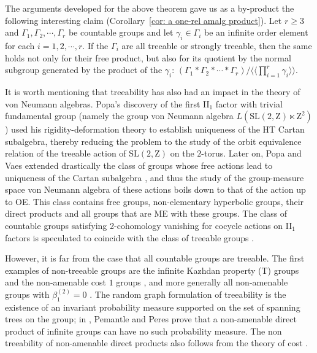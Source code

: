 \documentclass[11pt]{amsart}
\theoremstyle{definition}
\theoremstyle{plain}
\newcommand{\<}{\langle}
\renewcommand{\>}{\rangle}
\newcommand{\Z}{\bm{\mathrm{Z}}}
\newcommand{\pmp}{\text{p.m.p.}}
\begin{document}
The arguments developed for the above theorem gave us as a by-product the following interesting claim (Corollary~\ref{cor: a one-rel amalg product}).
Let $r\geq 3$ and $\Gamma_1, \Gamma_2, \cdots, \Gamma_r$ be countable groups and let $\gamma_i\in \Gamma_i$ be an infinite order element for each $i=1, 2, \cdots, r$.
If the $\Gamma_i$ are all treeable or strongly treeable, then the same holds not only for their free product, but also for its quotient by the normal subgroup generated by the product of the $\gamma_i$:
$\left(\Gamma_1*\Gamma_2*\cdots *\Gamma_r\right)/\langle\langle  \prod_{i=1}^r \gamma_i\rangle\rangle$.

It is worth mentioning that treeability has also had an impact in the theory of von Neumann algebras. Popa's discovery \cite{Pop06a} of the first II$_1$ factor with trivial fundamental group (namely the group von Neumann algebra $L(\mathrm{SL}(2,\Z)\ltimes \Z^2)$)
 used his rigidity-deformation theory to establish uniqueness of the HT Cartan subalgebra, thereby reducing the problem to the study of the orbit equivalence relation of the treeable action of $\mathrm{SL}(2,\Z)$ on the $2$-torus. Later on, Popa and Vaes extended drastically the class of groups whose free \pmp{} actions lead to uniqueness of the Cartan subalgebra \cite{Popa-Vaes-2014-unique-Cartan-Fn, Popa-Vaes-2014-unique-Cartan-hyperbolic-gp}, and thus the study of the group-measure space von Neumann algebra of these actions boils down to that of the action up to OE. This class contains free groups, non-elementary hyperbolic groups, their direct products and all groups that are ME with these groups.
 The class of countable groups satisfying 2-cohomology vanishing for cocycle actions on II$_1$ factors is speculated to coincide with the class of  treeable groups
 \cite[Remarks 4.5]{Popa2018-vanishing}.

 However, it is far from the case that all countable groups are treeable. The first examples of non-treeable groups are the infinite Kazhdan property (T) groups \cite{AS90} and the non-amenable cost $1$ groups \cite[Th. 4]{Gab00a}, and more generally all non-amenable groups with $\beta_1^{(2)}=0$ \cite[Proposition 6.10]{Gab02}.
The random graph formulation of treeability is the existence of an invariant probability measure supported on the set of spanning trees on the group; in \cite{PP00}, Pemantle and Peres prove that a non-amenable direct product of infinite groups can have no such probability measure. The non treeability of non-amenable direct products also follows from the theory of cost \cite{Gab00a}.
\end{document}
